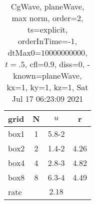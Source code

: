 \begin{table}[H]\tableFont %
\begin{center}
\begin{tabular}{|l|c|c|c|} \hline 
grid  & N &  $ u $ & r \\ \hline 
      box1 &     1 & \num{5.8}{-2} &        \\ \hline
      box2 &     2 & \num{1.4}{-2} &  4.26  \\ \hline
      box4 &     4 & \num{2.8}{-3} &  4.82  \\ \hline
      box8 &     8 & \num{6.3}{-4} &  4.49  \\ \hline
    rate             &       &  $2.18$       &       \\ \hline
\end{tabular}
\caption{CgWave, planeWave, max norm, order=$2$, ts=explicit, orderInTime=-1, dtMax0=$10000000000$, $t=.5$, cfl=$0.9$, diss=$0$, -known=planeWave, kx=1, ky=1, kz=1, Sat Jul 17 06:23:09 2021}\label{table:planeWaveOrder2max}
\end{center}
\end{table}
